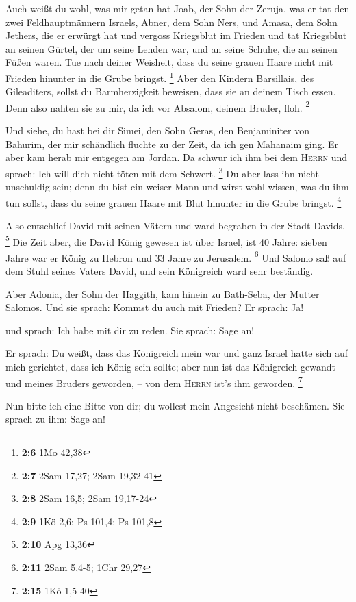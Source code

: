  Auch weißt du wohl, was mir getan hat Joab, der Sohn der
Zeruja, was er tat den zwei Feldhauptmännern Israels, Abner, dem Sohn
Ners, und Amasa, dem Sohn Jethers, die er erwürgt hat und vergoss
Kriegsblut im Frieden und tat Kriegsblut an seinen Gürtel, der um seine
Lenden war, und an seine Schuhe, die an seinen Füßen waren.
 Tue nach deiner Weisheit, dass du seine grauen Haare
nicht mit Frieden hinunter in die Grube bringst. \footnote{\textbf{2:6}
  1Mo 42,38}  Aber den Kindern Barsillais, des
Gileaditers, sollst du Barmherzigkeit beweisen, dass sie an deinem Tisch
essen. Denn also nahten sie zu mir, da ich vor Absalom, deinem Bruder,
floh. \footnote{\textbf{2:7} 2Sam 17,27; 2Sam 19,32-41}

 Und siehe, du hast bei dir Simei, den Sohn Geras, den
Benjaminiter von Bahurim, der mir schändlich fluchte zu der Zeit, da ich
gen Mahanaim ging. Er aber kam herab mir entgegen am Jordan. Da schwur
ich ihm bei dem \textsc{Herrn} und sprach: Ich will dich nicht töten mit
dem Schwert. \footnote{\textbf{2:8} 2Sam 16,5; 2Sam 19,17-24}
 Du aber lass ihn nicht unschuldig sein; denn du bist ein
weiser Mann und wirst wohl wissen, was du ihm tun sollst, dass du seine
grauen Haare mit Blut hinunter in die Grube bringst. \footnote{\textbf{2:9}
  1Kö 2,6; Ps 101,4; Ps 101,8}

 Also entschlief David mit seinen Vätern und ward
begraben in der Stadt Davids. \footnote{\textbf{2:10} Apg 13,36}
 Die Zeit aber, die David König gewesen ist über Israel,
ist 40 Jahre: sieben Jahre war er König zu Hebron und 33 Jahre zu
Jerusalem. \footnote{\textbf{2:11} 2Sam 5,4-5; 1Chr 29,27}
 Und Salomo saß auf dem Stuhl seines Vaters David, und
sein Königreich ward sehr beständig.

 Aber Adonia, der Sohn der Haggith, kam hinein zu
Bath-Seba, der Mutter Salomos. Und sie sprach: Kommst du auch mit
Frieden? Er sprach: Ja!

 und sprach: Ich habe mit dir zu reden. Sie sprach: Sage
an!

 Er sprach: Du weißt, dass das Königreich mein war und
ganz Israel hatte sich auf mich gerichtet, dass ich König sein sollte;
aber nun ist das Königreich gewandt und meines Bruders geworden, -- von
dem \textsc{Herrn} ist's ihm geworden. \footnote{\textbf{2:15} 1Kö
  1,5-40}

 Nun bitte ich eine Bitte von dir; du wollest mein
Angesicht nicht beschämen. Sie sprach zu ihm: Sage an!

